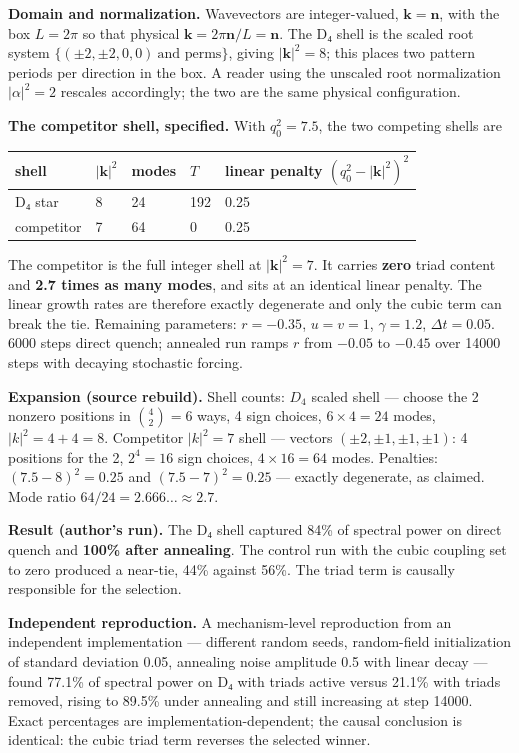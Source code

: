 \documentclass[a4paper,11pt]{article}
\newcommand{\expansion}[1]{\par\smallskip\noindent\textbf{Expansion (source rebuild).} #1\par\smallskip}
\begin{document}
\textbf{Domain and normalization.} Wavevectors are integer-valued, $\mathbf{k}=\mathbf{n}$, with the box $L=2\pi$ so that physical $\mathbf{k}=2\pi\mathbf{n}/L=\mathbf{n}$. The D₄ shell is the scaled root system $\{(\pm2,\pm2,0,0)\ \text{and perms}\}$, giving $|\mathbf{k}|^2=8$; this places two pattern periods per direction in the box. A reader using the unscaled root normalization $|\alpha|^2=2$ rescales accordingly; the two are the same physical configuration.

\textbf{The competitor shell, specified.} With $q_0^2=7.5$, the two competing shells are

\begin{center}
\begin{tabular}{lllll}
\hline
shell & $|\mathbf{k}|^2$ & modes & $T$ & linear penalty $(q_0^2-|\mathbf{k}|^2)^2$ \\
\hline
D₄ star & 8 & 24 & 192 & 0.25 \\
competitor & 7 & 64 & 0 & 0.25 \\
\hline
\end{tabular}
\end{center}

The competitor is the full integer shell at $|\mathbf{k}|^2=7$. It carries \textbf{zero} triad content and \textbf{2.7 times as many modes}, and sits at an identical linear penalty. The linear growth rates are therefore exactly degenerate and only the cubic term can break the tie. Remaining parameters: $r=-0.35$, $u=v=1$, $\gamma=1.2$, $\Delta t=0.05$. 6000 steps direct quench; annealed run ramps $r$ from $-0.05$ to $-0.45$ over 14000 steps with decaying stochastic forcing.


\expansion{Shell counts: $D_4$ scaled shell --- choose the 2 nonzero positions in $\binom{4}{2} = 6$ ways, 4 sign choices, $6 \times 4 = 24$ modes, $|k|^2 = 4 + 4 = 8$. Competitor $|k|^2 = 7$ shell --- vectors $(\pm2,\pm1,\pm1,\pm1)$: 4 positions for the 2, $2^4 = 16$ sign choices, $4 \times 16 = 64$ modes. Penalties: $(7.5-8)^2 = 0.25$ and $(7.5-7)^2 = 0.25$ --- exactly degenerate, as claimed. Mode ratio $64/24 = 2.666\ldots \approx 2.7$.}
\textbf{Result (author's run).} The D₄ shell captured 84\% of spectral power on direct quench and \textbf{100\% after annealing}. The control run with the cubic coupling set to zero produced a near-tie, 44\% against 56\%. The triad term is causally responsible for the selection.

\textbf{Independent reproduction.} A mechanism-level reproduction from an independent implementation — different random seeds, random-field initialization of standard deviation 0.05, annealing noise amplitude 0.5 with linear decay — found 77.1\% of spectral power on D₄ with triads active versus 21.1\% with triads removed, rising to 89.5\% under annealing and still increasing at step 14000. Exact percentages are implementation-dependent; the causal conclusion is identical: the cubic triad term reverses the selected winner.
\end{document}
